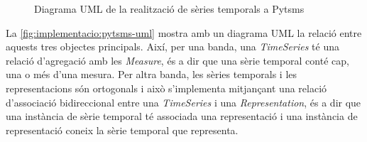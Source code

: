 \begin{figure}
  \centering


  \caption{Diagrama UML de la realització de sèries temporals a Pytsms}
  \label{fig:implementacio:pytsms-uml-ts}
\end{figure}





La \autoref{fig:implementacio:pytsms-uml} mostra amb un diagrama
UML la relació entre aquests tres objectes principals. Així, per una
banda, una \emph{TimeSeries} té una relació d'agregació amb les
\emph{Measure}, és a dir que una sèrie temporal conté cap, una o més
d'una mesura.  Per altra banda, les sèries temporals i les
representacions són ortogonals i això s'implementa mitjançant una
relació d'associació bidireccional entre una \emph{TimeSeries} i una
\emph{Representation}, és a dir que una instància de sèrie temporal té
associada una representació i una instància de representació coneix la
sèrie temporal que representa.




